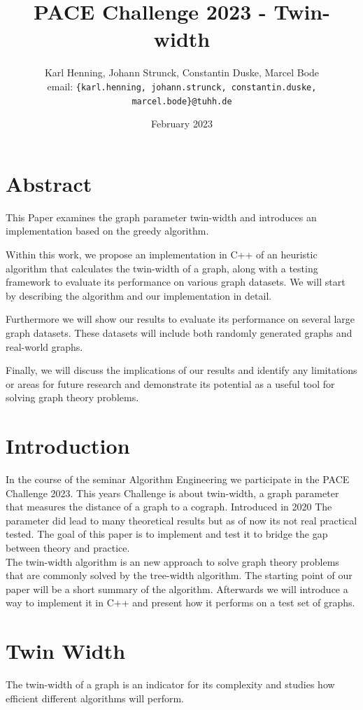 \documentclass[10pt]{article}
\date{February 2023}
\title{PACE Challenge 2023 - Twin-width}
\author{
    Karl Henning, Johann Strunck, Constantin Duske, Marcel Bode\\
    email: \texttt{\{karl.henning, johann.strunck, constantin.duske, marcel.bode\}@tuhh.de}
}
\begin{document}
\maketitle{}
\section{Abstract}

This Paper examines the graph parameter twin-width and introduces an implementation based on the greedy algorithm.

Within this work, we propose an implementation in C++ of an heuristic algorithm that calculates the twin-width of a graph, along with a testing framework to evaluate its performance on various graph datasets. We will start by describing the algorithm and our implementation in detail.

Furthermore we will show our results to evaluate its performance on several large graph datasets. These datasets will include both randomly generated graphs and real-world graphs.

Finally, we will discuss the implications of our results and identify any limitations or areas for future research and demonstrate its potential as a useful tool for solving graph theory problems.

\section{Introduction}


In the course of the seminar Algorithm Engineering we participate in the  PACE Challenge 2023. This years
Challenge is about twin-width, a graph parameter that measures the distance of a graph to
a cograph. Introduced in 2020 The parameter did lead to many theoretical results but as
of now its not real practical tested.  The goal of this paper is to implement and test it to bridge
the gap between theory and practice.\\ The twin-width algorithm is an new approach to
solve graph theory problems that are commonly solved by the tree-width algorithm. The
starting point of our paper will be a short summary of the algorithm. Afterwards we will
introduce a way to implement it in C++ and present how it performs on a test set of graphs.

\section{Twin Width}
The twin-width of a graph is an indicator for its complexity and studies how efficient
different algorithms will perform.
\end{document}
